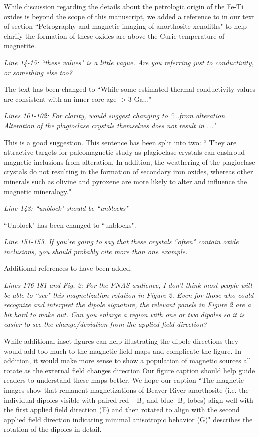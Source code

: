 \documentclass[11pt, letterpaper]{article}
\begin{document}
\begin{flushleft}
While discussion regarding the details about the petrologic origin of the Fe-Ti oxides is beyond the scope of this manuscript, we added a reference to \cite{Bian2021a} in our text of section ``Petrography and magnetic imaging of anorthosite xenoliths" to help clarify the formation of these oxides are above the Curie temperature of magnetite.

\textit{Line 14-15: ``these values" is a little vague. Are you referring just to conductivity, or something else too?}

The text has been changed to ``While some estimated thermal conductivity values are consistent with an inner core age $>$3 Ga..."

\textit{Lines 101-102: For clarity, would suggest changing to ``...from alteration. Alteration of the plagioclase crystals themselves does not result in ..."}

This is a good suggestion. This sentence has been split into two: `` They are attractive targets for paleomagnetic study as plagioclase crystals can enshroud magnetic inclusions from alteration. In addition, the weathering of the plagioclase crystals do not resulting in the formation of secondary iron oxides, whereas other minerals such as olivine and pyroxene are more likely to alter and influence the magnetic mineralogy."

\textit{Line 143: ``unblock" should be ``unblocks"}

``Unblock" has been changed to ``unblocks".

\textit{Line 151-153. If you're going to say that these crystals ``often" contain oxide inclusions, you should probably cite more than one example.}

Additional references to \cite{Wenk2011a, Ageeva2016a} have been added. 

\textit{Lines 176-181 and Fig. 2: For the PNAS audience, I don't think most people will be able to ``see" this magnetization rotation in Figure 2. Even for those who could recognize and interpret the dipole signature, the relevant panels in Figure 2 are a bit hard to make out. Can you enlarge a region with one or two dipoles so it is easier to see the change/deviation from the applied field direction?}

While additional inset figures can help illustrating the dipole directions they would add too much to the magnetic field maps and complicate the figure. In addition, it would make more sense to show a population of magnetic sources all rotate as the external field changes direction Our figure caption should help guide readers to understand these maps better. We hope our caption  ``The magnetic images show that remanent magnetizations of Beaver River anorthosite (i.e. the individual dipoles visible with paired red +B$_z$ and blue -B$_z$ lobes) align well with the first applied field direction (E) and then rotated to align with the second applied field direction indicating minimal anisotropic behavior (G)" describes the rotation of the dipoles in detail.


\end{flushleft}
\end{document}
